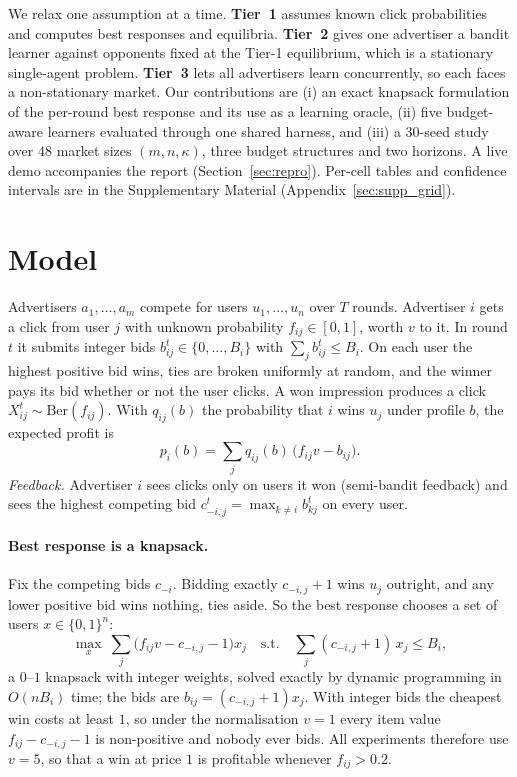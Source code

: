 \documentclass[11pt]{article}
\theoremstyle{remark}
\begin{document}
We relax one assumption at a time. \textbf{Tier~1} assumes known click probabilities and computes
best responses and equilibria. \textbf{Tier~2} gives one advertiser a bandit learner against opponents
fixed at the Tier-1 equilibrium, which is a stationary single-agent problem. \textbf{Tier~3} lets all
advertisers learn concurrently, so each faces a non-stationary market. Our contributions are
(i) an exact knapsack formulation of the per-round best response and its use as a learning oracle,
(ii) five budget-aware learners evaluated through one shared harness, and (iii) a $30$-seed study over
$48$ market sizes $(m,n,\kappa)$, three budget structures and two horizons. A live demo accompanies the
report (Section~\ref{sec:repro}). Per-cell tables and confidence intervals are in the Supplementary
Material (Appendix~\ref{sec:supp_grid}).

\section{Model}\label{sec:model}
Advertisers $a_1,\dots,a_m$ compete for users $u_1,\dots,u_n$ over $T$ rounds. Advertiser $i$ gets a
click from user $j$ with unknown probability $f_{ij}\in[0,1]$, worth $v$ to it. In round $t$ it submits
integer bids $b^t_{ij}\in\{0,\dots,B_i\}$ with $\sum_j b^t_{ij}\le B_i$. On each user the highest
positive bid wins, ties are broken uniformly at random, and the winner pays its bid whether or not the
user clicks. A won impression produces a click $X^t_{ij}\sim\mathrm{Ber}(f_{ij})$. With $q_{ij}(b)$ the
probability that $i$ wins $u_j$ under profile $b$, the expected profit is
\begin{equation}
  p_i(b)=\textstyle\sum_{j} q_{ij}(b)\,\big(f_{ij}v-b_{ij}\big).
\end{equation}
\emph{Feedback.} Advertiser $i$ sees clicks only on users it won (semi-bandit feedback) and sees the
highest competing bid $c^t_{-i,j}=\max_{k\ne i} b^t_{kj}$ on every user.

\paragraph{Best response is a knapsack.} Fix the competing bids $c_{-i}$. Bidding exactly
$c_{-i,j}+1$ wins $u_j$ outright, and any lower positive bid wins nothing, ties aside. So the best
response chooses a set of users $x\in\{0,1\}^n$:
\begin{equation}\label{eq:knap}
  \max_{x}\ \sum_j \big(f_{ij}v-c_{-i,j}-1\big)x_j
  \quad\text{s.t.}\quad \sum_j (c_{-i,j}+1)\,x_j\le B_i ,
\end{equation}
a $0$--$1$ knapsack with integer weights, solved exactly by dynamic programming in $O(nB_i)$ time; the
bids are $b_{ij}=(c_{-i,j}+1)x_j$. With integer bids the cheapest win costs at least $1$, so under the
normalisation $v=1$ every item value $f_{ij}-c_{-i,j}-1$ is non-positive and nobody ever bids. All
experiments therefore use $v=5$, so that a win at price $1$ is profitable whenever $f_{ij}>0.2$.
\end{document}
